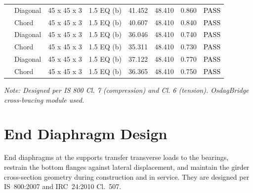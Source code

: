 \documentclass[12pt,a4paper]{report}
\numberwithin{table}{chapter}
\numberwithin{figure}{chapter}
\begin{document}
\begin{longtable}{|C{2.0cm}|L{1.8cm}|C{2.2cm}|C{3.0cm}|C{1.8cm}|C{1.8cm}|C{1.2cm}|C{1.8cm}|}
\hline
{} & Diagonal & 45 x 45 x 3 & 1.5 EQ (b) & 41.452 & 48.410 & 0.860 & \textcolor{black}{PASS} \\[6pt]
 & Chord & 45 x 45 x 3 & 1.5 EQ (b) & 40.607 & 48.410 & 0.840 & \textcolor{black}{PASS} \\[6pt]
\hline
{} & Diagonal & 45 x 45 x 3 & 1.5 EQ (b) & 36.046 & 48.410 & 0.740 & \textcolor{black}{PASS} \\[6pt]
 & Chord & 45 x 45 x 3 & 1.5 EQ (b) & 35.311 & 48.410 & 0.730 & \textcolor{black}{PASS} \\[6pt]
\hline
{} & Diagonal & 45 x 45 x 3 & 1.5 EQ (b) & 37.122 & 48.410 & 0.770 & \textcolor{black}{PASS} \\[6pt]
 & Chord & 45 x 45 x 3 & 1.5 EQ (b) & 36.365 & 48.410 & 0.750 & \textcolor{black}{PASS} \\[6pt]
\hline
\end{longtable}
\noindent\textit{Note: Designed per IS 800 Cl. 7 (compression) and Cl. 6 (tension). OsdagBridge cross-bracing module used.}

\section{End Diaphragm Design}
\label{sec:end-diaphragm}

End diaphragms at the supports transfer transverse loads to the bearings, restrain the bottom flanges against lateral displacement, and maintain the girder cross-section geometry during construction and in service. They are designed per IS~800:2007 and IRC~24:2010 Cl.~507.

\vspace{1em}

\vspace{0.4em}
\noindent
\setlength{\tabcolsep}{4pt}
\setlength{\LTleft}{0pt}
\setlength{\LTright}{\fill}
\end{document}
